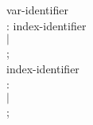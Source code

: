 \begin{tab}
\begin{tabbing}
var-identifier \\
\>: index-identifier \\
\>$|$ \IDENTIFIER  \\
\>; \\


index-identifier \\
\>: \ARRAYORBITVECID\LSQBRAC \IDENTIFIER \RSQBRAC \\
\>$|$ \ARRAYORBITVECID\LSQBRAC \NATNUM \RSQBRAC \\
\>;  \\

\end{tabbing}
\end{tab}











